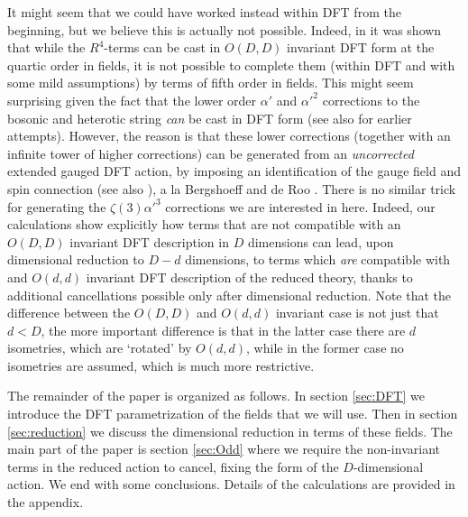 \documentclass[a4paper,11pt]{article}
\begin{document}
It might seem that we could have worked instead within DFT from the beginning, but we believe this is actually not possible. Indeed, in \cite{Hronek:2020xxi} it was shown that while the $R^4$-terms can be cast in $O(D,D)$ invariant DFT form at the quartic order in fields, it is not possible to complete them (within DFT and with some mild assumptions) by terms of fifth order in fields. This might seem surprising given the fact that the lower order $\alpha'$ and $\alpha'^2$ corrections to the bosonic and heterotic string \emph{can} be cast in DFT form \cite{Marques:2015vua,Hronek:2021nqk} (see also \cite{Hohm:2013jaa,Hohm:2014xsa} for earlier attempts). However, the reason is that these lower corrections (together with an infinite tower of higher corrections) can be generated from an \emph{uncorrected} extended gauged DFT action, by imposing an identification of the gauge field and spin connection \cite{Baron:2018lve,Baron:2020xel} (see also \cite{Lee:2015kba}), a la Bergshoeff and de Roo \cite{Bergshoeff:1988nn,Bergshoeff:1989de}. There is no similar trick for generating the $\zeta(3)\alpha'^3$ corrections we are interested in here. Indeed, our calculations show explicitly how terms that are not compatible with an $O(D,D)$ invariant DFT description in $D$ dimensions can lead, upon dimensional reduction to $D-d$ dimensions, to terms which \emph{are} compatible with and $O(d,d)$ invariant DFT description of the reduced theory, thanks to additional cancellations possible only after dimensional reduction. Note that the difference between the $O(D,D)$ and $O(d,d)$ invariant case is not just that $d<D$, the more important difference is that in the latter case there are $d$ isometries, which are `rotated' by $O(d,d)$, while in the former case no isometries are assumed, which is much more restrictive.

The remainder of the paper is organized as follows. In section \ref{sec:DFT} we introduce the DFT parametrization of the fields that we will use. Then in section \ref{sec:reduction} we discuss the dimensional reduction in terms of these fields. The main part of the paper is section \ref{sec:Odd} where we require the non-invariant terms in the reduced action to cancel, fixing the form of the $D$-dimensional action. We end with some conclusions. Details of the calculations are provided in the appendix.
\end{document}
